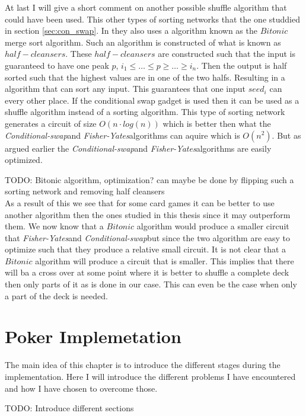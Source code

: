 \documentclass[twoside,11pt,openright]{report}
\newcommand{\todo}[1]{}
\renewcommand{\todo}[1]{{\color{red} TODO: {#1}} \\}
\newcommand{\FY}{\textit{Fisher-Yates}}
\newcommand{\CS}{\textit{Conditional-swap}}
\begin{document}
\bigskip

At last I will give a short comment on another possible shuffle algorithm that could have been used. This other types of sorting networks that the one studdied in section \ref{sec:con_swap}. In  they also uses a algorithm known as the $Bitonic$ merge sort algorithm. Such an algorithm is constructed of what is known as $half-cleansers$. These $half-cleansers$ are constructed such that the input is guaranteed to have one peak $p$, $i_1\leq \dots \leq p \geq \dots \geq i_n$. Then the output is half sorted such that the highest values are in one of the two halfs. Resulting in a algorithm that can sort any input. This guarantees that one input $seed_i$ can every other place. If the conditional swap gadget is used then it can be used as a shuffle algorithm instead of a sorting algorithm. This type of sorting network generates a circuit of size $O(n\cdot log(n))$ which is better then what the \CS and \FY algorithms can aquire which is $O(n^2)$. But as argued earlier the \CS and \FY algorithms are easily optimized.

\todo{Bitonic algorithm, optimization? can maybe be done by flipping such a sorting network and removing half cleansers}

As a result of this we see that for some card games it can be better to use another algorithm then the ones studied in this thesis since it may outperform them. We now know that a $Bitonic$ algorithm would produce a smaller circuit that \FY and \CS but since the two algorithm are easy to optimize such that they produce a relative small circuit. It is not clear that a $Bitonic$ algorithm will produce a circuit that is smaller. This implies that there will ba a cross over at some point where it is better to shuffle a complete deck then only parts of it as is done in our case. This can even be the case when only a part of the deck is needed.


\chapter{Poker Implemetation}
\label{ch:implementation}
The main idea of this chapter is to introduce the different stages during the implementation. Here I will introduce the different problems I have encountered and how I have chosen to overcome those.

\todo{Introduce different sections}
\end{document}
